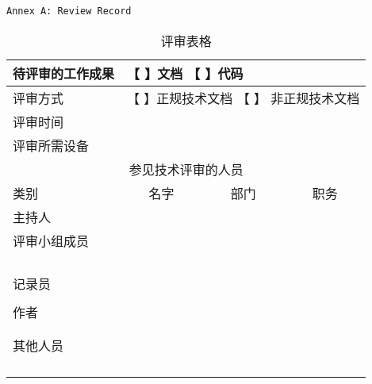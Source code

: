 \documentclass[12pt,a4paper]{article}
\begin{document}
\begin{table}[!htp]
\verb=Annex A: Review Record =\\
\begin{tabular}{|c|c|c|c|}
\hline
\multicolumn{0}{|l|}{待评审的工作成果} & \multicolumn{3}{|l|}{【 】文档 【 】代码} \\
\hline
\multicolumn{0}{|l|}{评审方式} & \multicolumn{3}{|l|}{【 】正规技术文档 【 】 非正规技术文档} \\
\hline
\multicolumn{0}{|l|}{评审时间} & \multicolumn{3}{|l|}{} \\
\hline
\multicolumn{0}{|l|}{评审所需设备} & \multicolumn{3}{|l|}{} \\
\hline
\multicolumn{4}{|c|}{参见技术评审的人员} \\
\hline
\multicolumn{0}{|l|}{类别} \hspace*{0.0005\linewidth}& 名字 \hspace*{0.1\linewidth}  & 部门 \hspace*{0.1\linewidth}  & 职务 \hspace*{0.1\linewidth} \\
\hline
\multicolumn{0}{|l|}{主持人}& & & \\
\hline
\multicolumn{0}{|l|}{评审小组成员} & & & \\
\hline
& & & \\
\hline
& & & \\
\hline
& & & \\
\hline
& & & \\
\hline
\multicolumn{0}{|l|}{记录员} & & & \\
\hline
& & & \\
\hline
\multicolumn{0}{|l|}{作者} & & & \\
\hline
& & & \\
\hline
& & & \\
\hline
\multicolumn{0}{|l|}{其他人员} & & & \\
\hline
& & & \\
\hline
& & & \\
\hline
& & & \\
\hline
& & & \\
\hline

\end{tabular}
\caption{评审表格}
\end{table}
\end{document}
